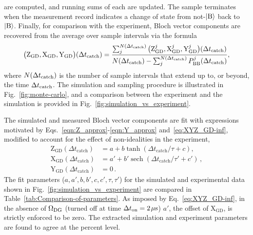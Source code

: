 \documentclass[
						superscriptaddress, 																 amsmath, amssymb,
		 aps,  prb,  
										floatfix,
		linenumbers,
			]{revtex4-1}
\begin{document}
are computed, and running sums of each are updated. The sample terminates when the measurement record indicates a change of state from not-$|{\rm B}\rangle$ back to $|{\rm B}\rangle$. Finally, for comparison with the experiment, Bloch vector components are recovered from the average over sample intervals via the formula
\begin{equation}
\big({\rm Z}_{\rm GD},{\rm X}_{\rm GD},{\rm Y}_{\rm GD}\big)(\Delta t_{\rm catch})=\frac{\sum_j^{N(\Delta t_{\rm catch})}\big({\rm Z}_{\rm GD}^j,{\rm X}_{\rm GD}^j,{\rm Y}_{\rm GD}^j\big)(\Delta t_{\rm catch})}{N(\Delta t_{\rm catch})-\sum_j^{N(\Delta t_{\rm catch})}P_{\rm BB}^j(\Delta t_{\rm catch})},
\label{eqn:ensemble_average}
\end{equation}
where $N(\Delta t_{\rm catch})$ is the number of sample intervals that extend up to, or beyond, the time $\Delta t_{\rm catch}$. The simulation and sampling procedure is illustrated in Fig.~\ref{fig:monte-carlo}, and a comparison between the experiment and the simulation is provided in Fig.~\ref{fig:simulation_vs_experiment}.


The simulated and measured Bloch vector components are fit with expressions motivated by Eqs.~\eqref{eqn:Z_approx}-\eqref{eqn:Y_approx} and~\eqref{eq:XYZ_GD-inf}, modified to account for the effect of non-idealities in the experiment, 
\begin{align}
\mathrm{Z}_{\text{GD}}(\Delta t_{\operatorname{catch}}) & =\ensuremath{a+b\tanh(\Delta t_{\operatorname{catch}}/\tau+c)},\\
\ensuremath{\mathrm{X}_{\text{GD}}(\Delta t_{\operatorname{catch}})} & =a'+b'\operatorname{sech}(\Delta t_{\operatorname{catch}}/\tau'+c')\,,\\
\mathrm{Y}_{\text{GD}}(\Delta t_{\operatorname{catch}}) & =0\,.
\end{align}
The fit parameters  ($a,a',b,b',c,c',\tau,\tau'$) for the simulated and experimental data shown in Fig.~\ref{fig:simulation_vs_experiment} are compared in Table~\ref{tab:Comparison-of-parameters}. 
As imposed by Eq.~\eqref{eq:XYZ_GD-inf}, in the absence of $\Omega_{\rm DG}$ (turned off at time $\Delta t_{\rm on}=2\mkern2mu\mu{\rm s}$) $a'$, the  offset of $\mathrm{X}_{\text{GD}}$,  is strictly enforced to be zero.
The extracted simulation and experiment parameters are found to agree at the percent level. 
\end{document}
